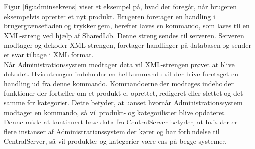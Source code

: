 Figur \ref{fig:adminsekvens} viser et eksempel på, hvad der foregår, når brugeren eksempelvis opretter et nyt produkt. Brugeren foretager en handling i brugergrænsefladen og trykker gem, herefter laves en kommando, som laves til en XML-streng ved hjælp af SharedLib. Denne streng sendes til serveren. Serveren modtager og dekoder XML strengen, foretager handlinger på databasen og sender et svar tilbage i XML format.\\
Når Administrationssystem modtager data vil XML-strengen prøvet at blive dekodet. Hvis strengen indeholder en hel kommando vil der blive foretaget en handling ud fra denne kommando. Kommandoerne der modtages indeholder funktioner der fortæller om et produkt er oprettet, redigeret eller slettet og det samme for kategorier. Dette betyder, at uanset hvornår Administrationssystem modtager en kommando, så vil produkt- og kategorilister blive opdateret.\\
Denne måde at kontinuert læse data fra CentralServer betyder, at hvis der er flere instanser af Administrationssystem der kører og har forbindelse til CentralServer, så vil produkter og kategorier være ens på begge systemer.